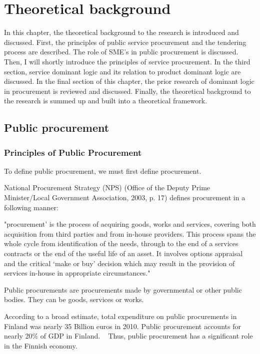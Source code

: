\documentclass[12pt,a4paper,oneside,pdftex]{report}
\begin{document}
% 

\chapter{Theoretical background}
\label{chapter:theory}

In this chapter, the theoretical background to the research is introduced and discussed. First, the principles of public service procurement and the tendering process are described. The role of SME’s in public procurement is discussed. Then, I will shortly introduce the principles of service procurement. In the third section, service dominant logic and its relation to product dominant logic are discussed. In the final section of this chapter, the prior research of dominant logic in procurement is reviewed and discussed. Finally, the theoretical background to the research is summed up and built into a theoretical framework.

\section{Public procurement}
\subsection {Principles of Public Procurement}
To define public procurement, we must first define procurement. 

National Procurement Strategy (NPS) (Office of the Deputy Prime Minister/Local Government Association, 2003, p. 17) defines procurement in a following manner:

"procurement’ is the process of acquiring goods, works and services, covering both acquisition from third parties and from in-house providers. This process spans the whole cycle from identification of the needs, through to the end of a services contracts or the end of the useful life of an asset. It involves options appraisal and the critical ‘make or buy’ decision which may result in the provision of services in-house in appropriate circumstances."

Public procurements are procurements made by governmental or other public bodies. They can be goods, services or works. ~\citep{Hankintaopas}

According to a broad estimate, total expenditure on public procurements in Finland was nearly 35 Billion euros in 2010. Public procurement accounts for nearly 20\% of GDP in Finland. ~\citep{EU2011} Thus, public procurement has a significant role in the Finnish economy. 
\end{document}

